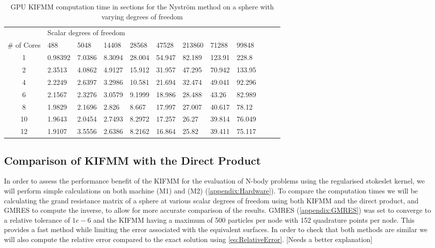 \begin{table}[ht]
    \centering
    \setlength{\tabcolsep}{6pt}
    \renewcommand{\arraystretch}{1.4}
    \small
    \begin{tabular}{c|lllllllllll}
     & \multicolumn{8}{l}{Scalar degrees of freedom} \\ \cline{2-9}
    \# of Cores & 488 & 5048 & 14408 & 28568 & 47528 & 213860 & 71288 & 99848 \\ \hline
    1 & 0.98392 & 7.0386 & 8.3094 & 28.004 & 54.947 & 82.189 & 123.91 & 228.8 \\
    2 & 2.3513 & 4.0862 & 4.9127 & 15.912 & 31.957 & 47.295 & 70.942 & 133.95 \\
    4 & 2.2249 & 2.6397 & 3.2986 & 10.581 & 21.694 & 32.474 & 49.041 & 92.296 \\
    6 & 2.1567 & 2.3276 & 3.0579 & 9.1999 & 18.986 & 28.488 & 43.26 & 82.989 \\
    8 & 1.9829 & 2.1696 & 2.826 & 8.667 & 17.997 & 27.007 & 40.617 & 78.12 \\
    10 & 1.9643 & 2.0454 & 2.7493 & 8.2972 & 17.257 & 26.27 & 39.814 & 76.049 \\
    12 & 1.9107 & 3.5556 & 2.6386 & 8.2162 & 16.864 & 25.82 & 39.411 & 75.117 \\
    \end{tabular}
    \caption{GPU KIFMM computation time in sections for the Nyström method on a sphere with varying degrees of freedom}
    \label{tab:GPUparalisation}
\end{table}



\subsection{Comparison of KIFMM with the Direct Product}
In order to assess the performance benefit of the KIFMM for the evaluation of N-body problems using the regularised stokeslet kernel, we will perform simple calculations on both machine (M1) and (M2) (\cref{appendix:Hardware}). To compare the computation times we will be calculating the grand resistance matrix of a sphere at various scalar degrees of freedom using both KIFMM and the direct product, and GMRES to compute the inverse, to allow for more accurate comparison of the results. GMRES (\cref{appendix:GMRES}) was set to converge to a relative tolerance of $1e-6$ and the KIFMM having a maximum of 500 particles per node with 152 quadrature points per node. This provides a fast method while limiting the error associated with the equivalent surfaces. In order to check that both methods are similar we will also compute the relative error compared to the exact solution using \cref{eq:RelativeError}. [Needs a better explanation]


